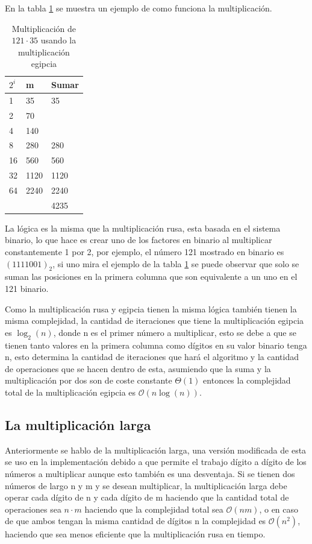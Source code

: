 \documentclass[10pt,journal,compsoc]{IEEEtran}
\begin{document}
En la tabla \ref{tab:egipcia} se muestra un ejemplo de como  funciona la multiplicación.

\begin{table}[!h]
\centering
\label{tab:egipcia}
\begin{tabular}{ll|l}
$2^i$   & m    & Sumar \\ \hline
1 & 35 &  35\\ 
2 & 70 &  \\ 
4 & 140 &  \\ 
8 & 280 &  280\\ 
16 & 560 & 560 \\
32 & 1120 & 1120 \\
64 & 2240 & 2240 \\ \hline
 & & 4235 \\
\end{tabular}
\caption{Multiplicación de $121\cdot 35$ usando la multiplicación egipcia}
\end{table}

La lógica es la misma que la multiplicación rusa, esta basada en el sistema binario, lo que hace es crear uno de los factores en binario al multiplicar constantemente 1 por 2, por ejemplo, el número 121 mostrado en binario es $(1111001)_2$, si uno mira el ejemplo de la tabla \ref{tab:egipcia} se puede observar que solo se suman las posiciones en la primera columna que son equivalente a un uno en el 121 binario.

Como la multiplicación rusa y egipcia tienen la misma lógica también tienen la misma complejidad, la cantidad de iteraciones que tiene la multiplicación egipcia es $\log_2(n)$, donde n es el primer número a multiplicar, esto se debe a que se tienen tanto valores en la primera columna como dígitos en su valor binario tenga n, esto determina la cantidad de iteraciones que hará el algoritmo y la cantidad de operaciones que se hacen dentro de esta, asumiendo que la suma y la multiplicación por dos son de coste constante $\Theta(1)$ entonces la complejidad total de la multiplicación egipcia es $\mathcal{O}(n \log (n))$. 

\subsection{La multiplicación larga}

Anteriormente se hablo de la multiplicación larga, una versión modificada de esta se uso en la implementación debido a que permite el trabajo dígito a dígito de los números a multiplicar aunque esto también es una desventaja. Si se tienen dos números de largo n y m y se desean multiplicar, la multiplicación larga debe operar cada dígito de n y cada dígito de m haciendo que la cantidad total de operaciones sea $n\cdot m$ haciendo que la complejidad total sea $\mathcal{O}(nm)$, o en caso de que ambos tengan la misma cantidad de dígitos n la complejidad es $\mathcal{O}(n^2)$, haciendo que sea menos eficiente que la multiplicación rusa en tiempo.
\end{document}
